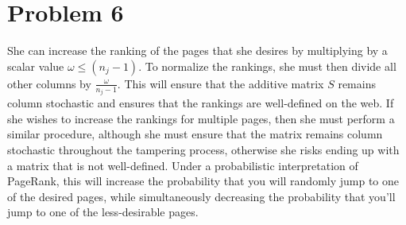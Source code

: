 \documentclass{article}%
\begin{document}
\section{Problem 6}
She can increase the ranking of the pages that she desires by multiplying by a scalar value $\omega \leq (n_j - 1)$. To normalize the rankings, she must then divide all other columns by $\frac{\omega}{n_j - 1}$. This will ensure that the additive matrix $S$ remains column stochastic and ensures that the rankings are well-defined on the web. If she wishes to increase the rankings for multiple pages, then she must perform a similar procedure, although she must ensure that the matrix remains column stochastic throughout the tampering process, otherwise she risks ending up with a matrix that is not well-defined. Under a probabilistic interpretation of PageRank, this will increase the probability that you will randomly jump to one of the desired pages, while simultaneously decreasing the probability that you'll jump to one of the less-desirable pages.
\end{document}
